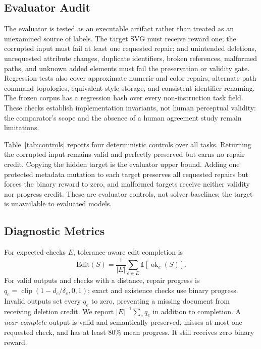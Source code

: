 \documentclass[11pt]{article}
\begin{document}
\begin{table}[t]
  \centering
  \small
  
  \caption{Deterministic evaluator controls over all \TaskCount{} tasks. Values
  are percentages; UCR is conditional on valid SVGs and is undefined when none
  are valid. The protected-mutation control verifies that completing every
  repair cannot compensate for an unrequested change.}
  \label{tab:controls}
\end{table}

\subsection{Evaluator Audit}
\label{sec:evaluator-audit}

The evaluator is tested as an executable artifact rather than treated as an
unexamined source of labels. The target SVG must receive reward one; the
corrupted input must fail at least one requested repair; and unintended
deletions, unrequested attribute changes, duplicate identifiers, broken
references, malformed paths, and unknown added elements must fail the
preservation or validity gate. Regression tests also cover approximate numeric
and color repairs, alternate path command topologies, equivalent style storage,
and consistent identifier renaming. The frozen corpus has a regression hash
over every non-instruction task field. These checks establish implementation
invariants, not human perceptual validity: the comparator's scope and the
absence of a human agreement study remain limitations.

Table~\ref{tab:controls} reports four deterministic controls over all tasks.
Returning the corrupted input remains valid and perfectly preserved but earns
no repair credit. Copying the hidden target is the evaluator upper bound. Adding
one protected metadata mutation to each target preserves all requested repairs
but forces the binary reward to zero, and malformed targets receive neither
validity nor progress credit. These are evaluator controls, not solver baselines:
the target is unavailable to evaluated models.

\subsection{Diagnostic Metrics}

For expected checks $E$, tolerance-aware edit completion is
\[
  \mathrm{Edit}(S)=\frac{1}{|E|}\sum_{e\in E}\mathbb{1}[\operatorname{ok}_e(S)].
\]
For valid outputs and checks with a distance, repair progress is
$q_e=\operatorname{clip}(1-d_e/\delta_e,0,1)$; exact and existence checks use
binary progress. Invalid outputs set every $q_e$ to zero, preventing a missing
document from receiving deletion credit. We report $|E|^{-1}\sum_e q_e$ in addition to completion. A
\emph{near-complete} output is valid and semantically preserved, misses at most
one requested check, and has at least 80\% mean progress. It still receives zero
binary reward.
\end{document}
